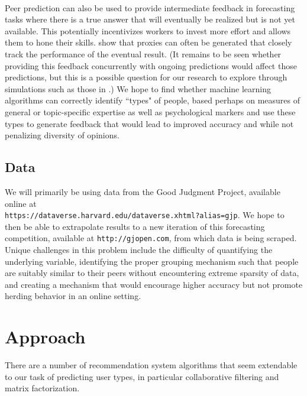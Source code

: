 \documentclass[a4paper, 11pt]{article}
\begin{document}
\paragraph{} Peer prediction can also be used to provide intermediate feedback in forecasting tasks where there is a true answer that will eventually be realized but is not yet available. This potentially incentivizes workers to invest more effort and allows them to hone their skills. \citet{witkowski2017proper} show that proxies can often be generated that closely track the performance of the eventual result. (It remains to be seen whether providing this feedback concurrently with ongoing predictions would affect those predictions, but this is a possible question for our research to explore through simulations such as those in \citet{shnayder2016measuring}.) We hope to find whether machine learning algorithms can correctly identify ``types" of people, based perhaps on measures of general or topic-specific expertise as well as psychological markers and use these types to generate feedback that would lead to improved accuracy and while not penalizing diversity of opinions. 
\subsection{Data}
We will primarily be using data from the Good Judgment Project, available online at  \\ \texttt{https://dataverse.harvard.edu/dataverse.xhtml?alias=gjp}. We hope to then be able to extrapolate results to a new iteration of this forecasting competition, available at \texttt{http://gjopen.com}, from which data is being scraped. Unique challenges in this problem include the difficulty of quantifying the underlying variable, identifying the proper grouping mechanism such that people are suitably similar to their peers without encountering extreme sparsity of data, and creating a mechanism that would encourage higher accuracy but not promote herding behavior in an online setting.

\section{Approach}
There are a number of recommendation system algorithms that seem extendable to our task of predicting user types, in particular collaborative filtering and matrix factorization.
\end{document}
